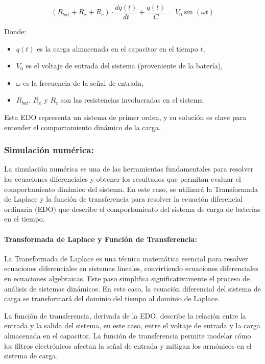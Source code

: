 \[
    (R_{bat} + R_x + R_c) \cdot \frac{dq(t)}{dt} + \frac{q(t)}{C} = V_0 \sin(\omega t)
\]

Donde:
\begin{itemize}
    \item \(q(t)\) es la carga almacenada en el capacitor en el tiempo \(t\),
    \item \(V_0\) es el voltaje de entrada del sistema (proveniente de la batería),
    \item \(\omega\) es la frecuencia de la señal de entrada,
    \item \(R_{bat}\), \(R_x\) y \(R_c\) son las resistencias involucradas en el sistema.
\end{itemize}

Esta EDO representa un sistema de primer orden, y su solución es clave para entender el
comportamiento dinámico de la carga.

\subsubsection*{Simulación numérica:}
La simulación numérica es una de las herramientas fundamentales para resolver las
ecuaciones diferenciales y obtener los resultados que permitan evaluar el comportamiento
dinámico del sistema. En este caso, se utilizará la Transformada de Laplace y la función de
transferencia para resolver la ecuación diferencial ordinaria (EDO) que describe el
comportamiento del sistema de carga de baterías en el tiempo.

\paragraph*{Transformada de Laplace y Función de Transferencia:}
La Transformada de Laplace es una técnica matemática esencial para resolver
ecuaciones diferenciales en sistemas lineales, convirtiendo ecuaciones diferenciales
en ecuaciones algebraicas. Este paso simplifica significativamente el proceso de
análisis de sistemas dinámicos. En este caso, la ecuación diferencial del sistema de
carga se transformará del dominio del tiempo al dominio de Laplace.

La función de transferencia, derivada de la EDO, describe la relación entre la entrada
y la salida del sistema, en este caso, entre el voltaje de entrada y la carga almacenada
en el capacitor. La función de transferencia permite modelar cómo los filtros
electrónicos afectan la señal de entrada y mitigan los armónicos en el sistema de
carga.

